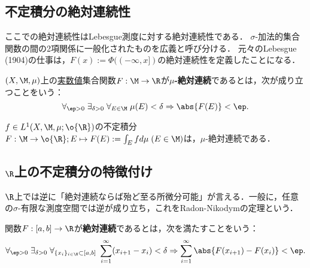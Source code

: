 \documentclass[uplatex, dvipdfmx]{jsreport}
\begin{document}
\subsection{不定積分の絶対連続性}

\begin{tcolorbox}[colframe=ForestGreen, colback=ForestGreen!10!white,breakable,colbacktitle=ForestGreen!40!white,coltitle=black,fonttitle=\bfseries\sffamily,
title=絶対連続性：積分で戻ってくることが出来る微分の真の定義域を特徴付ける性質]
    ここでの絶対連続性はLebesgue測度に対する絶対連続性である．
    $\sigma$-加法的集合関数の間の2項関係に一般化されたものを広義と呼び分ける．
    元々のLebesgue (1904)の仕事は，$F(x):=\Phi((-\infty,x])$の絶対連続性を定義したことになる．
\end{tcolorbox}

\begin{definition}[集合関数の絶対連続性]
    $(X,\M,\mu)$上の\underline{実数値}集合関数$F:\M\to\R$が\textbf{$\mu$-絶対連続}であるとは，次が成り立つことをいう：
    \[\forall_{\ep>0}\;\exists_{\delta>0}\;\forall_{E\in\M}\;\mu(E)<\delta\Rightarrow\abs{F(E)}<\ep.\]
\end{definition}

\begin{theorem}[不定積分は絶対連続]
    $f\in L^1(X,\M,\mu;\o{\R})$の不定積分$F:\M\to\o{\R};E\mapsto F(E):=\int_Efd\mu\;(E\in\M)$は，$\mu$-絶対連続である．
\end{theorem}



\subsection{$\R$上の不定積分の特徴付け}

\begin{tcolorbox}[colframe=ForestGreen, colback=ForestGreen!10!white,breakable,colbacktitle=ForestGreen!40!white,coltitle=black,fonttitle=\bfseries\sffamily,
title=不定積分であるとは絶対連続であるということである]
    $\R$上では逆に「絶対連続ならば殆ど至る所微分可能」が言える．一般に，任意の$\sigma$-有限な測度空間では逆が成り立ち，これをRadon-Nikodymの定理という．
\end{tcolorbox}

\begin{definition}[実数上の関数の絶対連続性]
    関数$F:[a,b]\to\R$が\textbf{絶対連続}であるとは，次を満たすことをいう：
    \[\forall_{\ep>0}\;\exists_{\delta>0}\;\forall_{\{x_i\}_{i\in\N}\subset[a,b]}\;\sum^{\infty}_{i=1}(x_{i+1}-x_i)<\delta\Rightarrow\sum^\infty_{i=1}\abs{F(x_{i+1})-F(x_i)}<\ep.\]
\end{definition}
\end{document}
